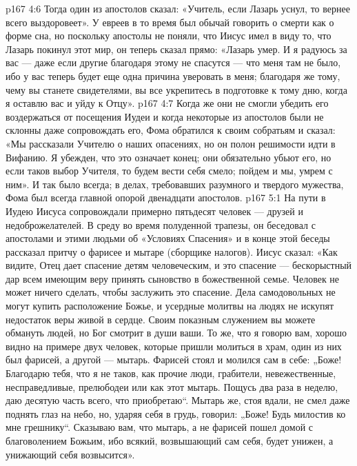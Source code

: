 \vs p167 4:6 Тогда один из апостолов сказал: «Учитель, если Лазарь уснул, то вернее всего выздоровеет». У евреев в то время был обычай говорить о смерти как о форме сна, но поскольку апостолы не поняли, что Иисус имел в виду то, что Лазарь покинул этот мир, он теперь сказал прямо: «Лазарь умер. И я радуюсь за вас --- даже если другие благодаря этому не спасутся --- что меня там не было, ибо у вас теперь будет еще одна причина уверовать в меня; благодаря же тому, чему вы станете свидетелями, вы все укрепитесь в подготовке к тому дню, когда я оставлю вас и уйду к Отцу».
\vs p167 4:7 Когда же они не смогли убедить его воздержаться от посещения Иудеи и когда некоторые из апостолов были не склонны даже сопровождать его, Фома обратился к своим собратьям и сказал: «Мы рассказали Учителю о наших опасениях, но он полон решимости идти в Вифанию. Я убежден, что это означает конец; они обязательно убьют его, но если таков выбор Учителя, то будем вести себя смело; пойдем и мы, умрем с ним». И так было всегда; в делах, требовавших разумного и твердого мужества, Фома был всегда главной опорой двенадцати апостолов.
\vs p167 5:1 На пути в Иудею Иисуса сопровождали примерно пятьдесят человек --- друзей и недоброжелателей. В среду во время полуденной трапезы, он беседовал с апостолами и этими людьми об «Условиях Спасения» и в конце этой беседы рассказал притчу о фарисее и мытаре (сборщике налогов). Иисус сказал: «Как видите, Отец дает спасение детям человеческим, и это спасение --- бескорыстный дар всем имеющим веру принять сыновство в божественной семье. Человек не может ничего сделать, чтобы заслужить это спасение. Дела самодовольных не могут купить расположение Божье, и усердные молитвы на людях не искупят недостаток веры живой в сердце. Своим показным служением вы можете обмануть людей, но Бог смотрит в души ваши. То же, что я говорю вам, хорошо видно на примере двух человек, которые пришли молиться в храм, один из них был фарисей, а другой --- мытарь. Фарисей стоял и молился сам в себе: „Боже! Благодарю тебя, что я не таков, как прочие люди, грабители, невежественные, несправедливые, прелюбодеи или как этот мытарь. Пощусь два раза в неделю, даю десятую часть всего, что приобретаю“. Мытарь же, стоя вдали, не смел даже поднять глаз на небо, но, ударяя себя в грудь, говорил: „Боже! Будь милостив ко мне грешнику“. Сказываю вам, что мытарь, а не фарисей пошел домой с благоволением Божьим, ибо всякий, возвышающий сам себя, будет унижен, а унижающий себя возвысится».
